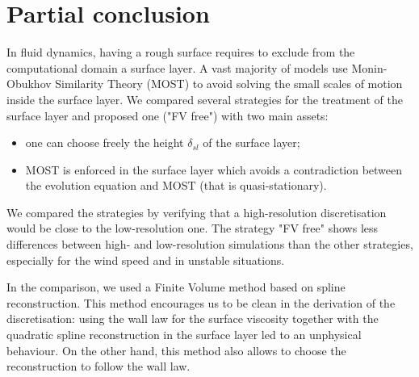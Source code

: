 \section{Partial conclusion}
In fluid dynamics, having a rough surface requires to exclude from
the computational domain a surface layer. A vast majority of models
use Monin-Obukhov Similarity Theory (MOST)
to avoid solving the small scales of motion inside the surface layer.
We compared several strategies for the treatment of the surface layer
and proposed one ("FV free") with two main assets:
\begin{itemize}
	\item one can choose freely the height $\delta_{sl}$
		of the surface layer;
	\item MOST is enforced in the surface layer which avoids
		a contradiction between the evolution equation and
		MOST (that is quasi-stationary).
\end{itemize}
We compared the strategies by verifying that a high-resolution
discretisation would be close to the low-resolution one.
The strategy "FV free" shows less differences between
high- and low-resolution simulations than the other strategies,
especially for the wind speed and in unstable situations.
\par
In the comparison, we used a Finite Volume method based on spline
reconstruction. This method encourages us to be
clean in the derivation of the discretisation: using the wall law
for the surface viscosity together with the quadratic spline
reconstruction in the surface layer led to an unphysical behaviour.
On the other hand, this method also allows to choose the
reconstruction to follow the wall law.
